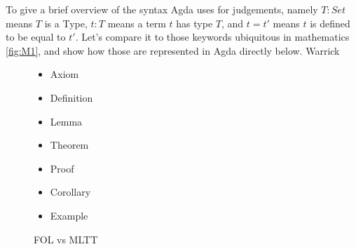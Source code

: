 \begin{code}[hide]
%
\\[\AgdaEmptyExtraSkip]%
\>[0]\AgdaSpace{}%
\AgdaSymbol{=}\AgdaSpace{}%
\<%
\\
%
\\[\AgdaEmptyExtraSkip]%
\>[0]\AgdaSpace{}%
\AgdaSymbol{:}\AgdaSpace{}%
\AgdaSpace{}%
\AgdaSpace{}%
\AgdaSpace{}%
\AgdaSpace{}%
\<%
\\
\>[0]\AgdaSpace{}%
\AgdaSpace{}%
\AgdaSymbol{=}\AgdaSpace{}%
\AgdaSpace{}%
\AgdaSpace{}%
\AgdaSpace{}%
\<%
\\
\>[0]\<%
\end{code}

To give a brief overview of the syntax Agda uses for judgements, namely $T :
Set$ means $T$ is a Type, $t : T$ means a term $t$ has type $T$, and $t = t'$
means $t$ is defined to be equal to $t'$. Let's compare it to those keywords
ubiquitous in mathematics \autoref{fig:M1}, and show how those are represented in Agda directly below. Warrick

\begin{figure}[H]
\centering

\begin{itemize}
\item Axiom
\item Definition
\item Lemma
\item Theorem
\item Proof
\item Corollary
\item Example
\end{itemize}

\caption{FOL vs MLTT} \label{fig:M1}
\end{figure}

